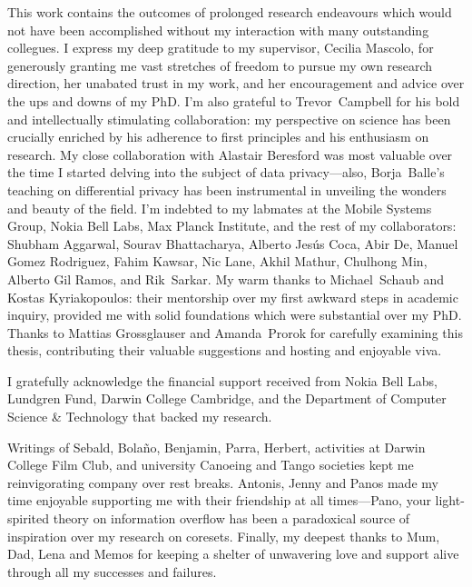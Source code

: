 
\begin{acknowledgements}
This work contains the outcomes of prolonged research endeavours which would not have been accomplished without my interaction with many outstanding collegues. I express my deep gratitude to my supervisor, Cecilia Mascolo, for generously granting me vast stretches of freedom to pursue my own research direction, her unabated trust in my work, and her encouragement and advice over the ups and downs of my PhD. I'm also grateful to \mbox{Trevor Campbell} for his bold and intellectually stimulating collaboration: my perspective on science has been crucially enriched by his adherence to first principles and his enthusiasm on research. My close collaboration with Alastair Beresford was most valuable over the time I started delving into the subject of data privacy---also, \mbox{Borja Balle's} teaching on differential privacy has been instrumental in unveiling the wonders and beauty of the field. I'm indebted to my labmates at the Mobile Systems Group, Nokia Bell Labs, Max Planck Institute, and the rest of my collaborators: Shubham Aggarwal, Sourav Bhattacharya, Alberto Jes\'{u}s Coca, Abir De, Manuel Gomez Rodriguez, Fahim Kawsar, Nic Lane,  Akhil Mathur, Chulhong Min, Alberto Gil Ramos, and \mbox{Rik Sarkar}. My warm thanks to \mbox{Michael Schaub} and Kostas Kyriakopoulos: their mentorship over my first awkward steps in academic inquiry, provided me with solid foundations which were substantial over my PhD. Thanks to Mattias Grossglauser and \mbox{Amanda Prorok} for carefully examining this thesis, contributing their valuable suggestions and hosting and enjoyable viva.

I gratefully acknowledge the financial support received from Nokia Bell Labs, Lundgren Fund, Darwin College Cambridge, and the Department of Computer Science \& Technology that backed my research. 

Writings of Sebald, Bola{\~{n}}o, Benjamin, Parra, Herbert, activities at Darwin College Film Club, and university Canoeing and Tango societies kept me reinvigorating company over rest breaks. Antonis, Jenny and Panos made my time enjoyable supporting me with their friendship at all times---Pano, your light-spirited theory on information overflow has been a paradoxical source of inspiration over my research on coresets. Finally, my deepest thanks to Mum, Dad, Lena and Memos for keeping a shelter of unwavering love and support alive through all my successes and failures.
\end{acknowledgements}
